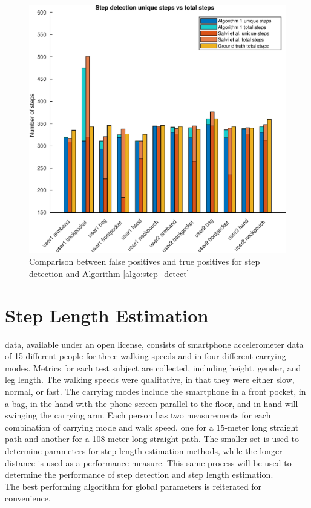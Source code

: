 \begin{figure}[H]
	\centering
	\includegraphics[width=0.7\linewidth]{images/20201112_1857_Step_detection_unique_steps_vs_total_steps_}
	\setlength{\belowcaptionskip}{-20pt}
\caption[False positives and true positives step detection comparison]{Comparison between false positives and true positives for \citet{Salvi2018} step detection and Algorithm \ref{algo:step_detect}}
\label{fig:sd_tp_fp_comparison}
\end{figure}

\section{Step Length Estimation}

\citet{Vezocnik2019} data, available under an open license, consists of smartphone accelerometer data of 15 different people for three walking speeds and in four different carrying modes. Metrics for each test subject are collected, including height, gender, and leg length. The walking speeds were qualitative, in that they were either slow, normal, or fast. The carrying modes include the smartphone in a front pocket, in a bag, in the hand with the phone screen parallel to the floor, and in hand will swinging the carrying arm. Each person has two measurements for each combination of carrying mode and walk speed, one for a 15-meter long straight path and another for a 108-meter long straight path. The smaller set is used to determine parameters for step length estimation methods, while the longer distance is used as a performance measure. This same process will be used to determine the performance of step detection and step length estimation.\\
The best performing algorithm for global parameters is reiterated for convenience,

